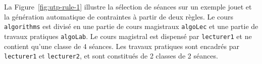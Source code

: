

La Figure~\ref{fig:utp-rule-1} illustre la sélection de séances sur un exemple jouet et la génération automatique de contraintes à partir de deux règles.
Le cours \texttt{algorithms} est divisé en une partie de cours magistraux \texttt{algoLec} et une partie de travaux pratiques \texttt{algoLab}.
Le cours magistral est dispensé par \texttt{lecturer1} et ne contient qu'une classe de 4 séances. Les travaux pratiques sont encadrés par \texttt{lecturer1} et \texttt{lecturer2}, et sont constitués de 2 classes de 2 séances.

